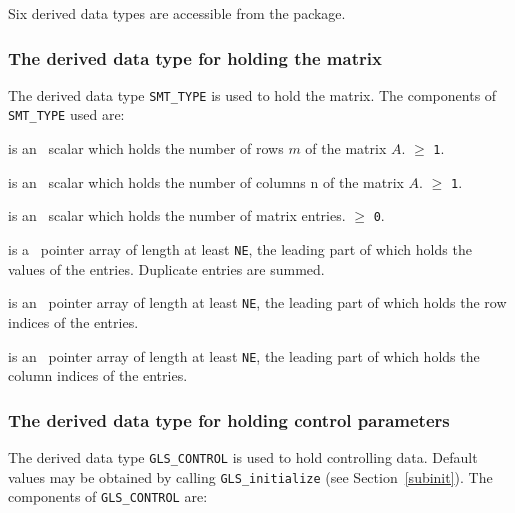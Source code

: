 \documentclass{galahad}
\newcommand{\packagename}{GLS}
\begin{document}




\galtypes
Six derived data types are accessible from the package.


\subsubsection{The derived data type for holding the matrix}\label{typemat}
The derived data type {\tt SMT\_TYPE} is used to hold 
the matrix. The components of {\tt SMT\_TYPE} used are:

\begin{description}

 is an \integer\ scalar which holds the number of rows $m$ of
   the matrix $A$.
 $\geq$ {\tt 1}.

 is an \integer\ scalar which holds the number of columns {n}
   of the matrix $A$.
 $\geq$ {\tt 1}.

 is an \integer\ scalar which holds the  number of matrix entries.  
 $\geq$ {\tt 0}.

 is a \realdp\  pointer array of length at least {\tt NE},
the leading part of which holds the values of the entries.
Duplicate entries are summed.

 is an \integer\  pointer array of length at least {\tt NE},
the leading part of which holds the row indices of the entries.

 is an \integer\  pointer array of length at least {\tt NE},
the leading part of which holds the column indices of the entries.

\end{description}


\subsubsection{The derived data type for holding control 
 parameters}\label{typecontrol}
The derived data type 
{\tt \packagename\_CONTROL} 
is used to hold controlling data. Default values may be obtained by calling 
{\tt \packagename\_initialize}
(see Section~\ref{subinit}). The components of 
{\tt \packagename\_CONTROL} 
are:
\end{document}
